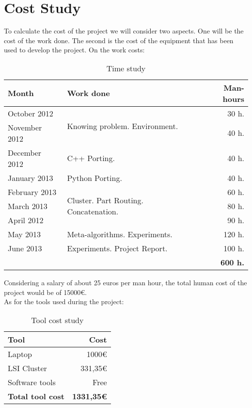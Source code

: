 \section{Cost Study}

To calculate the cost of the project we will consider two aspects. One will be the cost of the work done. The second is the cost of the equipment that has been used to develop the project. On the work costs:

\begin{table}[htbp]
\centering
\begin{tabular}{llr}
\textbf{Month} & \textbf{Work done} & \textbf{Man-hours} \\
\hline
October 2012 & \multirow{2}{*}{Knowing problem. Environment.} & 30 h. \\
November 2012 & & 40 h.\\
\hline
December 2012 & C++ Porting. & 40 h. \\
\hline
January 2013 & Python Porting. & 40 h.\\
\hline
February 2013 & \multirow{3}{*}{Cluster. Part Routing. Concatenation. } & 60 h.\\
March 2013 & & 80 h.\\
April 2012 & & 90 h.\\
\hline
May 2013 & Meta-algorithms. Experiments. & 120 h.\\
\hline
June 2013 & Experiments. Project Report. & 100 h.\\
\hline
& & \textbf{600 h.} \\
\end{tabular}
\caption{Time study}
\end{table}

Considering a salary of about 25 euros per man hour, the total human cost of the project would be of 15000\euro. \\


As for the tools used during the project:
\begin{table}[H]
\centering
\begin{tabular}{lr}
\textbf{Tool} & \textbf{Cost} \\
\hline
Laptop & 1000\euro \\
LSI Cluster & 331,35\euro \\
Software tools & Free \\
\hline
\textbf{Total tool cost} & \textbf{1331,35\euro}
\end{tabular}
\caption{Tool cost study}
\end{table}

